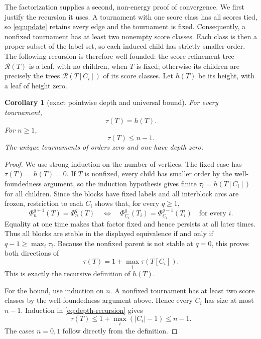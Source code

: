 \documentclass[11pt,a4paper]{amsart}
\newtheorem{corollary}[theorem]{Corollary}
\theoremstyle{definition}
\theoremstyle{remark}
\begin{document}
The factorization supplies a second, non-energy proof of convergence.  We
first justify the recursion it uses.  A tournament with one score class has
all scores tied, so \eqref{eq:update} retains every edge and the tournament
is fixed.  Consequently, a nonfixed tournament has at least two nonempty
score classes.  Each class is then a proper subset of the label set, so each
induced child has strictly smaller order.  The following recursion is
therefore well-founded: the score-refinement tree $\mathcal R(T)$ is a leaf,
with no children, when $T$ is fixed; otherwise its children are precisely
the trees $\mathcal R(T[C_i])$ of its score classes.  Let $h(T)$ be its
height, with a leaf of height zero.

\begin{corollary}[exact pointwise depth and universal bound]\label{cor:depth}
For every tournament,
\begin{equation}\label{eq:tree-depth}
                       \tau(T)=h(T).
\end{equation}
For $n\geq1$,
\begin{equation}\label{eq:depth-bound}
                       \tau(T)\leq n-1.
\end{equation}
The unique tournaments of orders zero and one have depth zero.
\end{corollary}

\begin{proof}
We use strong induction on the number of vertices.  The fixed case has
$\tau(T)=h(T)=0$.  If $T$ is nonfixed, every child has smaller order by the
well-foundedness argument, so the induction hypothesis gives finite
$\tau_i=h(T[C_i])$ for all children.
Since the blocks have fixed labels and all
interblock arcs are frozen, restriction to each $C_i$ shows that, for every
$q\geq1$,
\[
 \Phi_n^{q+1}(T)=\Phi_n^q(T)
 \quad\Longleftrightarrow\quad
 \Phi_{C_i}^{q}(T_i)=\Phi_{C_i}^{q-1}(T_i)
 \quad\text{for every }i.
\]
Equality at one time makes that factor fixed and hence persists at all later
times.  Thus all blocks are stable in the displayed equivalence if and only
if $q-1\geq\max_i\tau_i$.  Because the nonfixed parent is not stable at
$q=0$, this proves both directions of
\begin{equation}\label{eq:depth-recursion}
             \tau(T)=1+\max_i\tau(T[C_i]).
\end{equation}
This is exactly the recursive definition of $h(T)$.

For the bound, use induction on $n$.  A nonfixed tournament has at least two
score classes by the well-foundedness argument above.  Hence every $C_i$ has
size at most $n-1$.
Induction in \eqref{eq:depth-recursion} gives
\[
 \tau(T)\leq1+\max_i(|C_i|-1)\leq n-1.
\]
The cases $n=0,1$ follow directly from the definition.
\end{proof}
\end{document}
